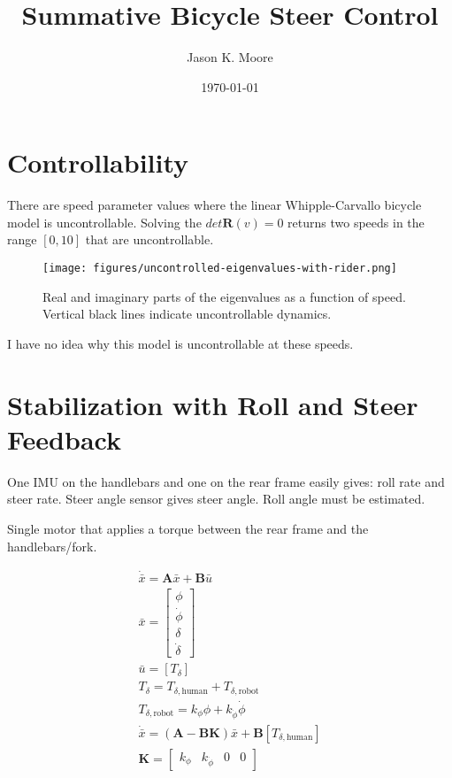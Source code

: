 \documentclass[12pt]{article}
\title{Summative Bicycle Steer Control}
\author{Jason K. Moore}
\date{\today}
\begin{document}
\maketitle

\section{Controllability}

There are speed parameter values where the linear Whipple-Carvallo bicycle
model is uncontrollable. Solving the \(det{\mathbf{R}(v)}=0\) returns two
speeds in the range \([0, 10]\) that are uncontrollable.

\begin{figure}
  \centering
  \texttt{[image: figures/uncontrolled-eigenvalues-with-rider.png]}
  \caption{Real and imaginary parts of the eigenvalues as a function of speed.
  Vertical black lines indicate uncontrollable dynamics.}
  \label{fig:uncontrolled-eigenvalues-with-rider}
\end{figure}

I have no idea why this model is uncontrollable at these speeds.

\section{Stabilization with Roll and Steer Feedback}

One IMU on the handlebars and one on the rear frame easily gives: roll rate and
steer rate. Steer angle sensor gives steer angle. Roll angle must be estimated.

Single motor that applies a torque between the rear frame and the
handlebars/fork.

\begin{align}
  \dot{\bar{x}} = \mathbf{A} \bar{x} + \mathbf{B} \bar{u} \\
  \bar{x} = \begin{bmatrix} \phi \\ \dot{\phi} \\ \delta \\ \dot{\delta} \end{bmatrix} \\
  \bar{u} = \left[ T_\delta \right] \\
  T_\delta = T_{\delta,\textrm{human}} + T_{\delta,\textrm{robot}} \\
  T_{\delta,\textrm{robot}} = k_\phi \phi + k_{\dot{\phi}} \dot{\phi} \\
  \dot{\bar{x}} = \left( \mathbf{A} - \mathbf{B} \mathbf{K} \right) \bar{x} + \mathbf{B} \left[ T_{\delta,\textrm{human}} \right] \\
  \mathbf{K} = \begin{bmatrix} k_\phi & k_{\dot{\phi}} & 0 & 0 \end{bmatrix}
\end{align}
\end{document}
